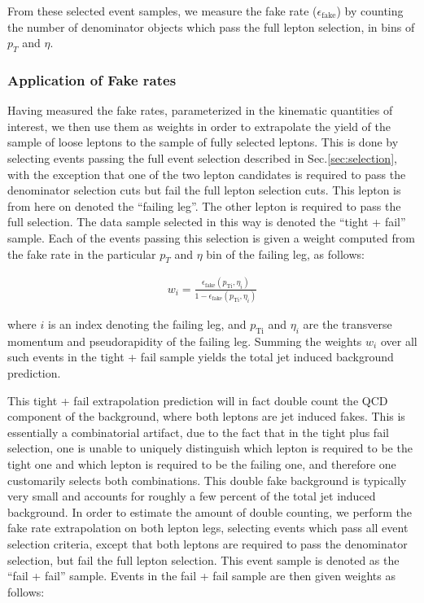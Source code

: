 From these selected event samples, we measure the fake rate 
($\epsilon_{\mathrm{fake}}$) by counting the number of denominator 
objects which pass the full lepton selection, in bins of $p_{T}$
and $\eta$. 

\subsubsection{Application of Fake rates}
\label{sec:fakerateApplication}

Having measured the fake rates, parameterized in the kinematic quantities of interest,
we then use them as weights in order to extrapolate the yield of the sample of loose
leptons to the sample of fully selected leptons. This is done by selecting events
passing the full event selection described in Sec.\ref{sec:selection}, 
with the exception that one of the two lepton
candidates is required to pass the denominator selection cuts but fail the full 
lepton selection cuts. This lepton is from here on denoted the ``failing leg''. 
The other lepton is required to pass the full selection.
The data sample selected in this way is denoted the ``tight + fail'' sample.
Each of the events passing this selection is given a weight computed from
the fake rate in the particular $p_{T}$ and $\eta$ bin of the 
failing leg, as follows:

\begin{eqnarray}
  w_{i} = \frac{\epsilon_{\mathrm{fake}}(p_{\mathrm{T i}},\eta_{i})}{1 - \epsilon_{\mathrm{fake}}(p_{\mathrm{T i}},\eta_{i})}
\end{eqnarray}

where $i$ is an index denoting the failing leg, and $p_{\mathrm{T i}}$ and $\eta_{i}$
are the transverse momentum and pseudorapidity of the failing leg. 
Summing the weights $w_{i}$ over all such events in the tight + fail sample yields
the total jet induced background prediction.

This tight + fail extrapolation prediction will in fact 
double count the QCD component of the background, where both leptons are jet induced
fakes. This is essentially a combinatorial artifact, due to the fact that in the tight
plus fail selection, one is unable to uniquely distinguish which lepton is required to
be the tight one and which lepton is required to be the failing one, and therefore
one customarily selects both combinations. This double fake background is 
typically very small and accounts for roughly a few percent of the total jet
induced background. In order to estimate the amount of double counting,
we perform the fake rate extrapolation on both lepton legs, selecting events
which pass all event selection criteria, except that both leptons are required
to pass the denominator selection, but fail the full lepton selection. This
event sample is denoted as the ``fail + fail'' sample. Events in the fail + fail
sample are then given weights as follows:

